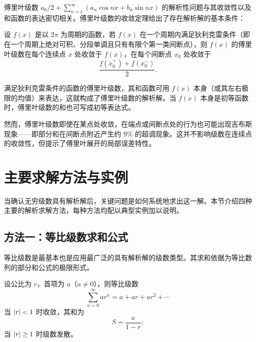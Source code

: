 傅里叶级数 $\displaystyle a_0/2 + \sum_{n=1}^{\infty} (a_n \cos nx + b_n \sin nx)$ 的解析性问题与其收敛性以及和函数的表达密切相关。傅里叶级数的收敛定理给出了存在解析解的基本条件：

\begin{theorem}[狄利克雷收敛定理]
设 $f(x)$ 是以 $2\pi$ 为周期的函数，若 $f(x)$ 在一个周期内满足狄利克雷条件（即在一个周期上绝对可积、分段单调且只有有限个第一类间断点），则 $f(x)$ 的傅里叶级数在每个连续点 $x$ 处收敛于 $f(x)$，在每个间断点 $x_0$ 处收敛于
\begin{equation}
\frac{f(x_0^+) + f(x_0^-)}{2}.
\end{equation}
\end{theorem}

满足狄利克雷条件的函数的傅里叶级数，其和函数可用 $f(x)$ 本身（或其左右极限的均值）来表达，这就构成了傅里叶级数的解析解。当 $f(x)$ 本身是初等函数时，傅里叶级数的和也可写成初等表达式。

然而，傅里叶级数即使在某点处收敛，在端点或间断点处的行为也可能出现吉布斯现象——即部分和在间断点附近产生约 $9\%$ 的超调现象。这并不影响级数在连续点的收敛性，但提示了傅里叶展开的局部误差特性。

\section{主要求解方法与实例}

当确认无穷级数具有解析解后，关键问题是如何系统地求出这一解。本节介绍四种主要的解析求解方法，每种方法均配以典型实例加以说明。

\subsection{方法一：等比级数求和公式}

等比级数是最基本也是应用最广泛的具有解析解的级数类型。其求和依据为等比数列的部分和公式的极限形式。

\begin{theorem}[等比级数求和定理]
设公比为 $r$，首项为 $a$（$a \neq 0$），则等比级数
\begin{equation}
\sum_{n=0}^{\infty} a r^n = a + ar + ar^2 + \cdots
\end{equation}
当 $\left|r\right| < 1$ 时收敛，其和为
\begin{equation} \label{eq:geom}
S = \frac{a}{1-r};
\end{equation}
当 $\left|r\right| \geq 1$ 时级数发散。
\end{theorem}

